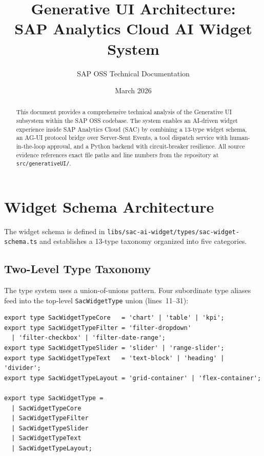\documentclass[11pt]{article}
\title{Generative UI Architecture:\\SAP Analytics Cloud AI Widget System}
\author{SAP OSS Technical Documentation}
\date{March 2026}
\begin{document}
\maketitle

\begin{abstract}
This document provides a comprehensive technical analysis of the Generative UI
subsystem within the SAP OSS codebase. The system enables an AI-driven widget
experience inside SAP Analytics Cloud (SAC) by combining a 13-type widget schema,
an AG-UI protocol bridge over Server-Sent Events, a tool dispatch service with
human-in-the-loop approval, and a Python backend with circuit-breaker resilience.
All source evidence references exact file paths and line numbers from the
repository at \texttt{src/generativeUI/}.
\end{abstract}

\tableofcontents
\newpage

\section{Widget Schema Architecture}
\label{sec:schema}

The widget schema is defined in
\texttt{libs/sac-ai-widget/types/sac-widget-schema.ts} and establishes a
13-type taxonomy organized into five categories.

\subsection{Two-Level Type Taxonomy}

The type system uses a union-of-unions pattern. Four subordinate type aliases
feed into the top-level \texttt{SacWidgetType} union (lines~11--31):

\begin{lstlisting}[language={[Sharp]C},caption={Widget type taxonomy (sac-widget-schema.ts:11--31)}]
export type SacWidgetTypeCore   = 'chart' | 'table' | 'kpi';
export type SacWidgetTypeFilter = 'filter-dropdown'
  | 'filter-checkbox' | 'filter-date-range';
export type SacWidgetTypeSlider = 'slider' | 'range-slider';
export type SacWidgetTypeText   = 'text-block' | 'heading' | 'divider';
export type SacWidgetTypeLayout = 'grid-container' | 'flex-container';

export type SacWidgetType =
  | SacWidgetTypeCore
  | SacWidgetTypeFilter
  | SacWidgetTypeSlider
  | SacWidgetTypeText
  | SacWidgetTypeLayout;
\end{lstlisting}
\end{document}
